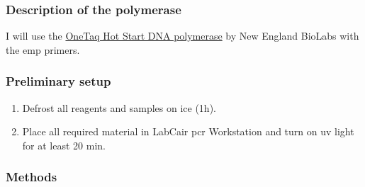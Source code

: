 \subsubsection{Description of the polymerase}

I will use the \href{https://www.neb.com/products/m0481-onetaq-hot-start-dna-polymerase#Product%20Information}{OneTaq Hot Start DNA polymerase} by New England BioLabs with the \gls{emp} primers.

\subsubsection{Preliminary setup}

\begin{enumerate}
\item Defrost all reagents and samples on ice (1h). 
\item Place all required material in LabCair \gls{pcr} Workstation and turn on \gls{uv} light for at least 20 min.
\end{enumerate}

\subsubsection{Methods}


